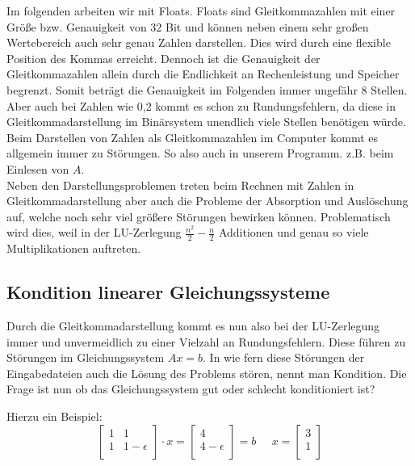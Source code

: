 \documentclass[course=erap]{aspdoc}
\begin{document}
Im folgenden arbeiten wir mit Floats. Floats sind Gleitkommazahlen mit einer Größe 
bzw. Genauigkeit von 32 Bit und können neben einem sehr großen Wertebereich auch 
sehr genau Zahlen darstellen. Dies wird durch eine flexible Position des Kommas erreicht. 
Dennoch ist die Genauigkeit der Gleitkommazahlen allein durch die Endlichkeit an 
Rechenleistung und Speicher begrenzt. Somit beträgt die 
Genauigkeit im Folgenden immer ungefähr 8 Stellen. Aber auch bei Zahlen wie 
0,2 kommt es schon zu Rundungsfehlern, da diese in Gleitkommadarstellung im Binärsystem unendlich 
viele Stellen benötigen würde. Beim Darstellen von Zahlen als Gleitkommazahlen im Computer 
kommt es allgemein immer zu Störungen. So also auch in unserem Programm. z.B. beim Einlesen von $A$.\\
Neben den Darstellungsproblemen treten beim Rechnen mit Zahlen in Gleitkommadarstellung aber auch 
die Probleme der Absorption und Auslöschung auf, welche noch sehr viel größere Störungen bewirken können. 
Problematisch wird dies, weil in der LU-Zerlegung $\frac{n^2}{2} - \frac{n}{2} $
Additionen und genau so viele Multiplikationen auftreten\cite[51]{M2017}. 

\subsection{Kondition linearer Gleichungssysteme}
Durch die Gleitkommadarstellung kommt es nun also bei der LU-Zerlegung immer und 
unvermeidlich zu einer Vielzahl an Rundungsfehlern. Diese führen zu Störungen im Gleichungssystem $Ax=b$. 
In wie fern diese Störungen der Eingabedateien auch die Lösung des Problems stören, nennt man Kondition\cite[46]{M2017}. 
Die Frage ist nun ob das Gleichungssystem gut oder schlecht konditioniert ist?

Hierzu ein Beispiel:
  \begin{equation}
    \label{absBeis}
    \begin{bmatrix}
    1	& 1	 \\
    1	& 1-\epsilon\\
    \end{bmatrix}
    \cdot x = 
    \begin{bmatrix}
    4 \\
    4- \epsilon\\
    \end{bmatrix}
    = b\;\;\;\;\;
    x = 
    \begin{bmatrix}
    3 \\
    1\\
    \end{bmatrix}
  \end{equation}
\end{document}

